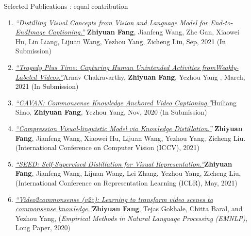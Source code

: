 \documentclass{resume} %
\begin{document}
\begin{rSection}{Selected Publications} 
{\small *: equal contribution} 

\begin{enumerate}

    \item\href{}{\textit{``Distilling Visual Concepts from Vision and Language Model for End-to-EndImage Captioning.''}}{ \textbf{Zhiyuan Fang}, Jianfeng Wang, Zhe Gan, Xiaowei Hu, Lin Liang, Lijuan Wang, Yezhou Yang, Zicheng Liu, Sep, 2021 (In Submission)}
        
    \item \href{}{\textit{``Tragedy Plus Time: Capturing Human Unintended Activities fromWeakly-Labeled Videos.''}}{Arnav Chakravarthy, \textbf{Zhiyuan Fang}, Yezhou Yang , March, 2021 (In Submission)}
    
        
    \item \href{}{\textit{``CAVAN: Commonsense Knowledge Anchored Video Captioning.''}}{Huiliang Shao, \textbf{Zhiyuan Fang}, Yezhou Yang, Nov, 2020 (In Submission)}
    



    \item\href{https://arxiv.org/abs/2104.02096}{\textit{``Compression Visual-linguistic Model via Knowledge Distillation.''}}{ \textbf{Zhiyuan Fang}, Jianfeng Wang, Xiaowei Hu, Lijuan Wang, Yezhou Yang, Zicheng Liu. (International Conference on Computer Vision (ICCV), 2021) }
    

    
    \item \href{https://arxiv.org/abs/2101.04731}{\textit{``SEED: Self-Supervised Distillation for Visual Representation.''}}{\textbf{{Zhiyuan Fang}}, Jianfeng Wang, Lijuan Wang, Lei Zhang, Yezhou Yang, Zicheng Liu,(International Conference on Representation Learning (ICLR), May, 2021)}
    
    
    \item \href{https://arxiv.org/pdf/2003.05162.pdf}{\textit{``Video2commonsense (v2c): Learning to transform video scenes to commonsense knowledge.''}}{\textbf{{Zhiyuan Fang}}, {Tejas Gokhale}, Chitta Baral, and Yezhou Yang, ({\textit{Empirical Methods in Natural Language Processing (EMNLP)}}, Long Paper, 2020)}
    

\end{enumerate}
\end{rSection}
\end{document}
